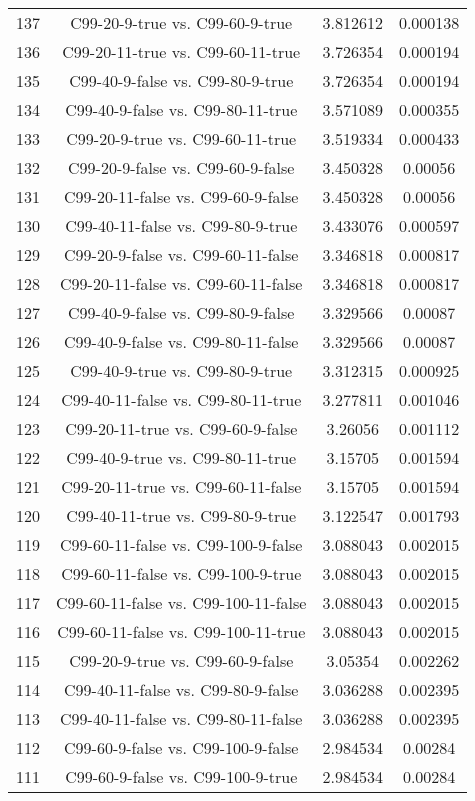 \documentclass[a4paper,10pt]{article}
\begin{document}
\begin{landscape}
\begin{table}[!htp]
\begin{tabular}{cccc}
137&C99-20-9-true vs. C99-60-9-true&3.812612&0.000138\\
136&C99-20-11-true vs. C99-60-11-true&3.726354&0.000194\\
135&C99-40-9-false vs. C99-80-9-true&3.726354&0.000194\\
134&C99-40-9-false vs. C99-80-11-true&3.571089&0.000355\\
133&C99-20-9-true vs. C99-60-11-true&3.519334&0.000433\\
132&C99-20-9-false vs. C99-60-9-false&3.450328&0.00056\\
131&C99-20-11-false vs. C99-60-9-false&3.450328&0.00056\\
130&C99-40-11-false vs. C99-80-9-true&3.433076&0.000597\\
129&C99-20-9-false vs. C99-60-11-false&3.346818&0.000817\\
128&C99-20-11-false vs. C99-60-11-false&3.346818&0.000817\\
127&C99-40-9-false vs. C99-80-9-false&3.329566&0.00087\\
126&C99-40-9-false vs. C99-80-11-false&3.329566&0.00087\\
125&C99-40-9-true vs. C99-80-9-true&3.312315&0.000925\\
124&C99-40-11-false vs. C99-80-11-true&3.277811&0.001046\\
123&C99-20-11-true vs. C99-60-9-false&3.26056&0.001112\\
122&C99-40-9-true vs. C99-80-11-true&3.15705&0.001594\\
121&C99-20-11-true vs. C99-60-11-false&3.15705&0.001594\\
120&C99-40-11-true vs. C99-80-9-true&3.122547&0.001793\\
119&C99-60-11-false vs. C99-100-9-false&3.088043&0.002015\\
118&C99-60-11-false vs. C99-100-9-true&3.088043&0.002015\\
117&C99-60-11-false vs. C99-100-11-false&3.088043&0.002015\\
116&C99-60-11-false vs. C99-100-11-true&3.088043&0.002015\\
115&C99-20-9-true vs. C99-60-9-false&3.05354&0.002262\\
114&C99-40-11-false vs. C99-80-9-false&3.036288&0.002395\\
113&C99-40-11-false vs. C99-80-11-false&3.036288&0.002395\\
112&C99-60-9-false vs. C99-100-9-false&2.984534&0.00284\\
111&C99-60-9-false vs. C99-100-9-true&2.984534&0.00284\\

\end{tabular}
\end{table}
\end{landscape}
\end{document}
